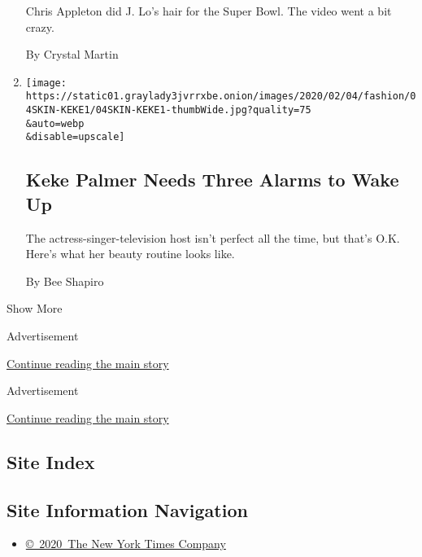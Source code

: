 \begin{enumerate}
  Chris Appleton did J. Lo's hair for the Super Bowl. The video went a
  bit crazy.

  By Crystal Martin
\item
  \href{/2020/02/04/style/keke-palmer-needs-three-alarms-to-wake-up.html}{}

  \texttt{[image: https://static01.graylady3jvrrxbe.onion/images/2020/02/04/fashion/04SKIN-KEKE1/04SKIN-KEKE1-thumbWide.jpg?quality=75\\\&auto=webp\\\&disable=upscale]}

  \hypertarget{keke-palmer-needs-three-alarms-to-wake-up}{%
  \subsection{Keke Palmer Needs Three Alarms to Wake
  Up}\label{keke-palmer-needs-three-alarms-to-wake-up}}

  The actress-singer-television host isn't perfect all the time, but
  that's O.K. Here's what her beauty routine looks like.

  By Bee Shapiro
\end{enumerate}

Show More

Advertisement

\protect\hyperlink{after-mid2}{Continue reading the main story}

Advertisement

\protect\hyperlink{after-mktg}{Continue reading the main story}

\hypertarget{site-index}{%
\subsection{Site Index}\label{site-index}}

\hypertarget{site-information-navigation}{%
\subsection{Site Information
Navigation}\label{site-information-navigation}}

\begin{itemize}
\tightlist
\item
  \href{https://help.nytimes3xbfgragh.onion/hc/en-us/articles/115014792127-Copyright-notice}{©~2020~The
  New York Times Company}
\end{itemize}

